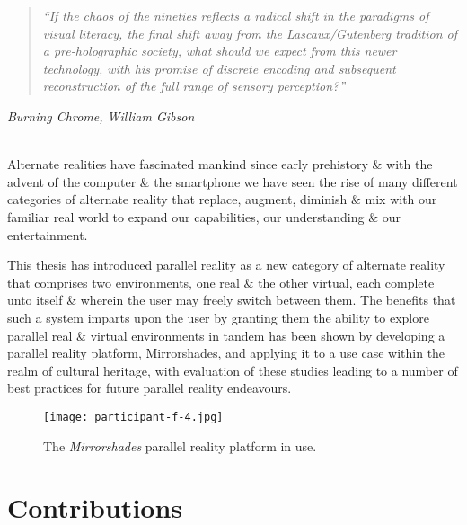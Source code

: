 \begin{quote}
	\textit{``If the chaos of the nineties reflects a radical shift in the paradigms of visual literacy, the final shift away from the Lascaux/Gutenberg tradition of a pre-holographic society, what should we expect from this newer technology, with his promise of discrete encoding and subsequent reconstruction of the full range of sensory perception?''}
\end{quote}
\hfill \textit{Burning Chrome, William Gibson}
\\
\\


\label{chapter-conclusions}

Alternate realities have fascinated mankind since early prehistory \& with the advent of the computer \& the smartphone we have seen the rise of many different categories of alternate reality that replace, augment, diminish \& mix with our familiar real world to expand our capabilities, our understanding \& our entertainment.

This thesis has introduced parallel reality as a new category of alternate reality that comprises two environments, one real \& the other virtual, each complete unto itself \& wherein the user may freely switch between them. The benefits that such a system imparts upon the user by granting them the ability to explore parallel real \& virtual environments in tandem has been shown by developing a parallel reality platform, Mirrorshades, and applying it to a use case within the realm of cultural heritage, with evaluation of these studies leading to a number of best practices for future parallel reality endeavours.

\begin{figure}[h]
	\begin{center}
		\texttt{[image: participant-f-4.jpg]}
		\caption{The \textit{Mirrorshades} parallel reality platform in use.}
		\label{participant-f-4.jpg}
	\end{center}	
\end{figure}


\section{Contributions}

